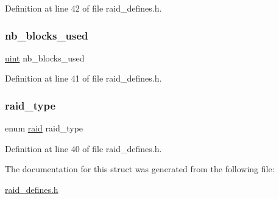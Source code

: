 Definition at line 42 of file raid\+\_\+defines.\+h.

\mbox{\label{structsuper__block__s_a471e84cd18cb41ccc12b4e188c003694}} 
\subsubsection{\texorpdfstring{nb\+\_\+blocks\+\_\+used}{nb\_blocks\_used}}
{\footnotesize\ttfamily \hyperlink{raid__defines_8h_a91ad9478d81a7aaf2593e8d9c3d06a14}{uint} nb\+\_\+blocks\+\_\+used}



Definition at line 41 of file raid\+\_\+defines.\+h.

\mbox{\label{structsuper__block__s_a531486677d7c826dad518c717abcd4ed}} 
\subsubsection{\texorpdfstring{raid\+\_\+type}{raid\_type}}
{\footnotesize\ttfamily enum \hyperlink{raid__defines_8h_a7a2279e0841d50aa8e976d3bb0eb3a6e}{raid} raid\+\_\+type}



Definition at line 40 of file raid\+\_\+defines.\+h.



The documentation for this struct was generated from the following file\+:\begin{DoxyCompactItemize}
\item 
\hyperlink{raid__defines_8h}{raid\+\_\+defines.\+h}\end{DoxyCompactItemize}
